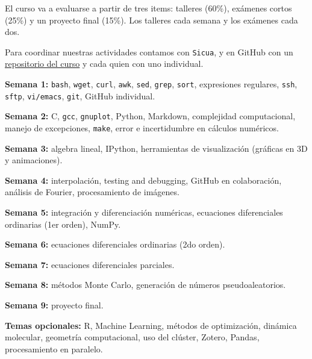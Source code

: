 \documentclass[letterpaper,10pt,onecolumn]{article}
\begin{document}
\vspace{0.3cm}
\noindent El curso va a evaluarse a partir de tres items: talleres (60\%), exámenes cortos (25\%) y un proyecto final (15\%). Los talleres cada semana y los exámenes cada dos.

\noindent Para coordinar nuestras actividades contamos con \verb+Sicua+, y en GitHub con un \href{https://github.com/ComputoCienciasUniandes/MetodosComputacionales}{repositorio del curso} y cada quien con uno individual.

\vspace{0.5cm}

\noindent\textbf{Semana 1:} \verb+bash+, \verb+wget+, \verb+curl+, \verb+awk+, \verb+sed+, \verb+grep+, \verb+sort+, expresiones regulares, \verb+ssh+, \verb+sftp+, \verb+vi/emacs+, \verb+git+, GitHub individual.

\noindent\textbf{Semana 2:} C, \verb+gcc+, \verb+gnuplot+, Python, Markdown, complejidad computacional, manejo de excepciones, \verb+make+, error e incertidumbre en cálculos numéricos.

\noindent\textbf{Semana 3:} algebra lineal, IPython, herramientas de visualización (gráficas en 3D y animaciones).

\noindent\textbf{Semana 4:} interpolación, testing and debugging, GitHub en colaboración, análisis de Fourier, procesamiento de imágenes.

\noindent\textbf{Semana 5:} integración y diferenciación numéricas, ecuaciones diferenciales ordinarias (1er orden), NumPy.

\noindent\textbf{Semana 6:} ecuaciones diferenciales ordinarias (2do orden).

\noindent\textbf{Semana 7:} ecuaciones diferenciales parciales.

\noindent\textbf{Semana 8:} métodos Monte Carlo, generación de números pseudoaleatorios.

\noindent\textbf{Semana 9:} proyecto final.

\vspace{0.1cm}
\noindent\textbf{Temas opcionales:} R, Machine Learning, métodos de optimización, dinámica molecular, geometría computacional, uso del clúster, Zotero, Pandas, procesamiento en paralelo.
\end{document}

